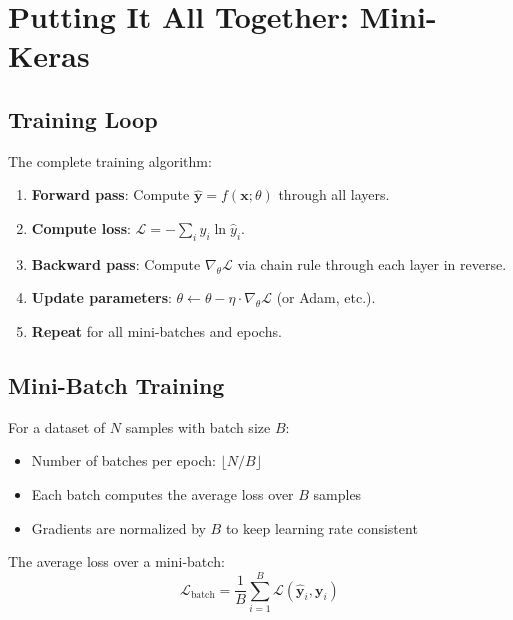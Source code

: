 \documentclass[12pt, a4paper]{report}
\theoremstyle{definition}
\begin{document}
\chapter{Putting It All Together: Mini-Keras}

\section{Training Loop}

The complete training algorithm:

\begin{enumerate}[label=\textbf{Step \arabic*:}]
    \item \textbf{Forward pass}: Compute $\hat{\mathbf{y}} = f(\mathbf{x}; \theta)$ through all layers.
    \item \textbf{Compute loss}: $\mathcal{L} = -\sum_i y_i \ln \hat{y}_i$.
    \item \textbf{Backward pass}: Compute $\nabla_\theta \mathcal{L}$ via chain rule through each layer in reverse.
    \item \textbf{Update parameters}: $\theta \leftarrow \theta - \eta \cdot \nabla_\theta \mathcal{L}$ (or Adam, etc.).
    \item \textbf{Repeat} for all mini-batches and epochs.
\end{enumerate}

\section{Mini-Batch Training}

For a dataset of $N$ samples with batch size $B$:
\begin{itemize}
    \item Number of batches per epoch: $\lfloor N / B \rfloor$
    \item Each batch computes the average loss over $B$ samples
    \item Gradients are normalized by $B$ to keep learning rate consistent
\end{itemize}

The average loss over a mini-batch:
\begin{equation}
    \mathcal{L}_\text{batch} = \frac{1}{B} \sum_{i=1}^{B} \mathcal{L}(\hat{\mathbf{y}}_i, \mathbf{y}_i)
\end{equation}
\end{document}
